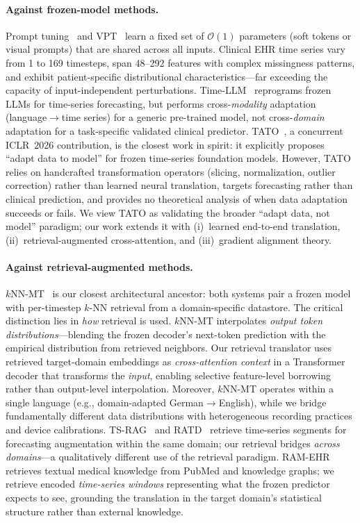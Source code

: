 \paragraph{Against frozen-model methods.}
Prompt tuning~\cite{lester2021prompt} and VPT~\cite{jia2022vpt} learn a fixed
set of $\mathcal{O}(1)$ parameters (soft tokens or visual prompts) that are
shared across all inputs.
Clinical EHR time series vary from 1 to 169 timesteps, span 48--292 features with
complex missingness patterns, and exhibit patient-specific distributional
characteristics---far exceeding the capacity of input-independent perturbations.
Time-LLM~\cite{jin2024timellm} reprograms frozen LLMs for time-series forecasting,
but performs cross-\emph{modality} adaptation (language$\to$time series) for a
generic pre-trained model, not cross-\emph{domain} adaptation for a task-specific
validated clinical predictor.
TATO~\cite{qiu2026tato}, a concurrent ICLR~2026 contribution, is the closest
work in spirit: it explicitly proposes ``adapt data to model'' for frozen
time-series foundation models.
However, TATO relies on handcrafted transformation operators (slicing,
normalization, outlier correction) rather than learned neural translation,
targets forecasting rather than clinical prediction, and provides no
theoretical analysis of when data adaptation succeeds or fails.
We view TATO as validating the broader ``adapt data, not model'' paradigm;
our work extends it with (i)~learned end-to-end translation,
(ii)~retrieval-augmented cross-attention, and (iii)~gradient alignment theory.

\paragraph{Against retrieval-augmented methods.}
$k$NN-MT~\cite{khandelwal2021knnmt} is our closest architectural ancestor:
both systems pair a frozen model with per-timestep $k$-NN retrieval from a
domain-specific datastore.
The critical distinction lies in \emph{how} retrieval is used.
$k$NN-MT interpolates \emph{output token distributions}---blending the frozen
decoder's next-token prediction with the empirical distribution from retrieved
neighbors.
Our retrieval translator uses retrieved target-domain embeddings as
\emph{cross-attention context} in a Transformer decoder that transforms the
\emph{input}, enabling selective feature-level borrowing rather than
output-level interpolation.
Moreover, $k$NN-MT operates within a single language (e.g., domain-adapted
German$\to$English), while we bridge fundamentally different data distributions
with heterogeneous recording practices and device calibrations.
TS-RAG~\cite{ning2025tsrag} and RATD~\cite{liu2024ratd} retrieve time-series
segments for forecasting augmentation within the same domain; our retrieval
bridges \emph{across domains}---a qualitatively different use of the retrieval
paradigm.
RAM-EHR~\cite{xu2024ramehr} retrieves textual medical knowledge from PubMed
and knowledge graphs; we retrieve encoded \emph{time-series windows}
representing what the frozen predictor expects to see, grounding the translation
in the target domain's statistical structure rather than external knowledge.


